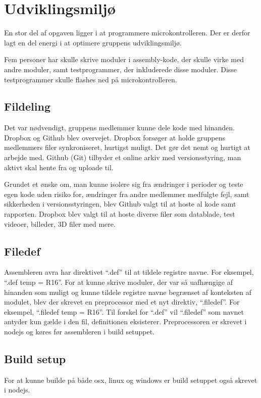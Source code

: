 \section{Udviklingsmiljø}

En stor del af opgaven ligger i at programmere microkontrolleren. Der er derfor lagt en del energi i at optimere gruppens udviklingsmiljø.

Fem personer har skulle skrive moduler i assembly-kode, der skulle virke med andre moduler, samt testprogrammer, der inkluderede disse moduler. Disse testprogrammer skulle flashes ned på microkontrolleren.

\subsection{Fildeling}
Det var nødvendigt, gruppens medlemmer kunne dele kode med hinanden. Dropbox og Github blev overvejet.
Dropbox forsøger at holde gruppens medlemmers filer synkroniseret, hurtigst muligt.
Det gør det nemt og hurtigt at arbejde med.
Github (Git) tilbyder et online arkiv med versionsstyring, man aktivt skal hente fra og uploade til.

Grundet et ønske om, man kunne isolere sig fra ændringer i perioder og teste egen kode uden risiko for, ændringer fra andre medlemmer medfulgte fejl, samt sikkerheden i versionsstyringen, blev Github valgt til at hoste al kode samt rapporten.
Dropbox blev valgt til at hoste diverse filer som datablade, test videoer, billeder, 3D filer med mere.

\subsection{Filedef}
Assembleren avra har direktivet ``.def'' til at tildele registre navne. For eksempel, ``.def temp = R16''.
For at kunne skrive moduler, der var så uafhængige af hinanden som muligt og kunne tildele registre navne begrænset af konteksten af modulet, blev der skrevet en preprocessor med et nyt direktiv, ``.filedef''. For eksempel, ``.filedef temp = R16''. Til forskel for ``.def'' vil ``.filedef'' som navnet antyder kun gælde i den fil, definitionen eksisterer. Preprocessoren er skrevet i nodejs og køres før assembleren i build setuppet.

\subsection{Build setup}
For at kunne builde på både osx, linux og windows er build setuppet også skrevet i nodejs.


